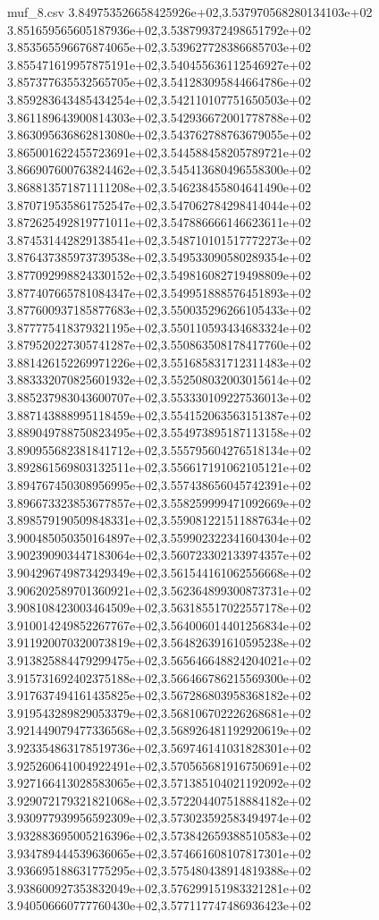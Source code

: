 \begin{filecontents*}{muf_8.csv}
3.849753526658425926e+02,3.537970568280134103e+02
3.851659565605187936e+02,3.538799372498651792e+02
3.853565596676874065e+02,3.539627728386685703e+02
3.855471619957875191e+02,3.540455636112546927e+02
3.857377635532565705e+02,3.541283095844664786e+02
3.859283643485434254e+02,3.542110107751650503e+02
3.861189643900814303e+02,3.542936672001778788e+02
3.863095636862813080e+02,3.543762788763679055e+02
3.865001622455723691e+02,3.544588458205789721e+02
3.866907600763824462e+02,3.545413680496558300e+02
3.868813571871111208e+02,3.546238455804641490e+02
3.870719535861752547e+02,3.547062784298414044e+02
3.872625492819771011e+02,3.547886666146623611e+02
3.874531442829138541e+02,3.548710101517772273e+02
3.876437385973739538e+02,3.549533090580289354e+02
3.877092998824330152e+02,3.549816082719498809e+02
3.877407665781084347e+02,3.549951888576451893e+02
3.877600937185877683e+02,3.550035296266105433e+02
3.877775418379321195e+02,3.550110593434683324e+02
3.879520227305741287e+02,3.550863508178417760e+02
3.881426152269971226e+02,3.551685831712311483e+02
3.883332070825601932e+02,3.552508032003015614e+02
3.885237983043600707e+02,3.553330109227536013e+02
3.887143888995118459e+02,3.554152063563151387e+02
3.889049788750823495e+02,3.554973895187113158e+02
3.890955682381841712e+02,3.555795604276518134e+02
3.892861569803132511e+02,3.556617191062105121e+02
3.894767450308956995e+02,3.557438656045742391e+02
3.896673323853677857e+02,3.558259999471092669e+02
3.898579190509848331e+02,3.559081221511887634e+02
3.900485050350164897e+02,3.559902322341604304e+02
3.902390903447183064e+02,3.560723302133974357e+02
3.904296749873429349e+02,3.561544161062556668e+02
3.906202589701360921e+02,3.562364899300873731e+02
3.908108423003464509e+02,3.563185517022557178e+02
3.910014249852267767e+02,3.564006014401256834e+02
3.911920070320073819e+02,3.564826391610595238e+02
3.913825884479299475e+02,3.565646648824204021e+02
3.915731692402375188e+02,3.566466786215569300e+02
3.917637494161435825e+02,3.567286803958368182e+02
3.919543289829053379e+02,3.568106702226268681e+02
3.921449079477336568e+02,3.568926481192920619e+02
3.923354863178519736e+02,3.569746141031828301e+02
3.925260641004922491e+02,3.570565681916750691e+02
3.927166413028583065e+02,3.571385104021192092e+02
3.929072179321821068e+02,3.572204407518884182e+02
3.930977939956592309e+02,3.573023592583494974e+02
3.932883695005216396e+02,3.573842659388510583e+02
3.934789444539636065e+02,3.574661608107817301e+02
3.936695188631775295e+02,3.575480438914819388e+02
3.938600927353832049e+02,3.576299151983321281e+02
3.940506660777760430e+02,3.577117747486936423e+02

\end{filecontents*}
